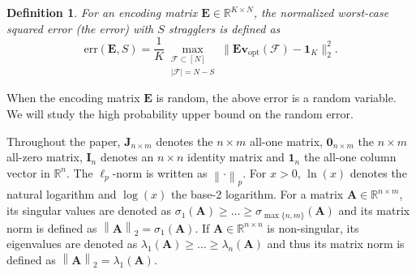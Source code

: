 \documentclass[lettersize,journal]{IEEEtran}
\newcommand{\err}[1]{\mathrm{err}(#1, S)}
\newcommand{\norm}[1]{\left\lVert#1\right\rVert}
\newcommand{\ones}[1]{\boldsymbol{1}_{#1}}
\newcommand{\F}{\mathcal{F}}
\newcommand{\ident}[1]{\boldsymbol{I}_{#1}}
\newcommand{\allones}[1]{\boldsymbol{J}_{#1}}
\newcommand{\allzeros}[1]{\boldsymbol{0}_{#1}}
\newcommand{\vopt}{\boldsymbol{v}_{\mathrm{opt}}}
\newcommand{\BE}{\boldsymbol{E}}
\newcommand{\RR}{\mathbb{R}}
\newtheorem{definition}{Definition}
\begin{document}
\begin{definition}
\label{def:error}
For an encoding matrix $\BE\in\mathbb{R}^{K\times N}$, 
the normalized worst-case squared error (the \emph{error}) with $S$ stragglers is defined as
\begin{equation}
\err{\BE}
= \frac{1}{K}\max_{\substack{\F \subset [N]\\ |\F| = N-S}}
\|\BE\vopt(\F) - \ones{K}\|_2^2.
\end{equation}
\end{definition}

When the encoding matrix $\BE$ is random, the above error is a random variable. We will study the high probability upper bound on the random error.

Throughout the paper, $\allones{n\times m}$ denotes the $n\times m$ all-one matrix, $\allzeros{n\times m}$ the $n\times m$ all-zero matrix, $\ident{n}$ denotes an $n\times n$ identity matrix and $\ones{n}$ the all-one column vector in $\mathbb{R}^n$. The $\ell_p$-norm is written as $\norm{\cdot}_p$. For $x>0$, $\ln(x)$ denotes the natural logarithm and $\log(x)$ the base-2 logarithm. For a matrix $\boldsymbol{A}\in \RR^{n\times m}$, its singular values are denoted as $\sigma_1(\boldsymbol{A}) \geq \dots \geq \sigma_{\max\{n, m\}}(\boldsymbol{A})$ and its matrix norm is defined as $\norm{\boldsymbol{A}}_2 = \sigma_1(\boldsymbol{A})$. If $\boldsymbol{A}\in \RR^{n\times n}$ is non-singular, its eigenvalues are denoted as $\lambda_1(\boldsymbol{\boldsymbol{A}}) \geq \dots \geq \lambda_n(\boldsymbol{A})$ and thus its matrix norm is defined as $\norm{\boldsymbol{A}}_2 = \lambda_1(\boldsymbol{A})$.
\end{document}
